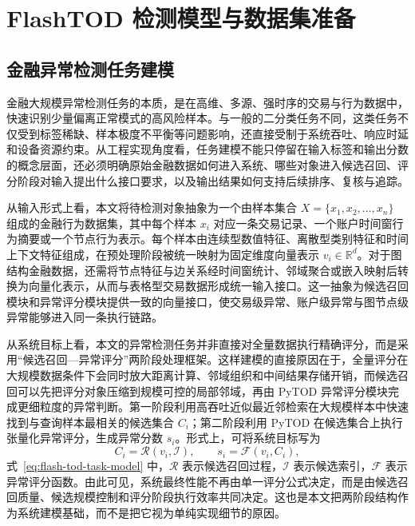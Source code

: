 
\chapter{FlashTOD 检测模型与数据集准备}

\section{金融异常检测任务建模}

金融大规模异常检测任务的本质，是在高维、多源、强时序的交易与行为数据中，快速识别少量偏离正常模式的高风险样本。与一般的二分类任务不同，这类任务不仅受到标签稀缺、样本极度不平衡等问题影响，还直接受制于系统吞吐、响应时延和设备资源约束。从工程实现角度看，任务建模不能只停留在输入标签和输出分数的概念层面，还必须明确原始金融数据如何进入系统、哪些对象进入候选召回、评分阶段对输入提出什么接口要求，以及输出结果如何支持后续排序、复核与追踪。

从输入形式上看，本文将待检测对象抽象为一个由样本集合 $X=\{x_1,x_2,\ldots,x_n\}$ 组成的金融行为数据集，其中每个样本 $x_i$ 对应一条交易记录、一个账户时间窗行为摘要或一个节点行为表示。每个样本由连续型数值特征、离散型类别特征和时间上下文特征组成，在预处理阶段被统一映射为固定维度向量表示 $v_i\in\mathbb{R}^d$。对于图结构金融数据，还需将节点特征与边关系经时间窗统计、邻域聚合或嵌入映射后转换为向量化表示，从而与表格型交易数据形成统一输入接口\citep{dgraphfin_paper}。这一抽象为候选召回模块和异常评分模块提供一致的向量接口，使交易级异常、账户级异常与图节点级异常能够进入同一条执行链路。

从系统目标上看，本文的异常检测任务并非直接对全量数据执行精确评分，而是采用``候选召回---异常评分''两阶段处理框架。这样建模的直接原因在于，全量评分在大规模数据条件下会同时放大距离计算、邻域组织和中间结果存储开销，而候选召回可以先把评分对象压缩到规模可控的局部邻域，再由 PyTOD 异常评分模块完成更细粒度的异常判断。第一阶段利用高吞吐近似最近邻检索在大规模样本中快速找到与查询样本最相关的候选集合 $C_i$；第二阶段利用 PyTOD 在候选集合上执行张量化异常评分，生成异常分数 $s_i$。形式上，可将系统目标写为
\begin{equation}
  C_i = \mathcal{R}(v_i, \mathcal{I}), \qquad s_i = \mathcal{F}(v_i, C_i),
  \label{eq:flash-tod-task-model}
\end{equation}
式~\eqref{eq:flash-tod-task-model} 中，$\mathcal{R}$ 表示候选召回过程，$\mathcal{I}$ 表示候选索引，$\mathcal{F}$ 表示异常评分函数。由此可见，系统最终性能不再由单一评分公式决定，而是由候选召回质量、候选规模控制和评分阶段执行效率共同决定。这也是本文把两阶段结构作为系统建模基础，而不是把它视为单纯实现细节的原因\citep{zhao2022tod}。


